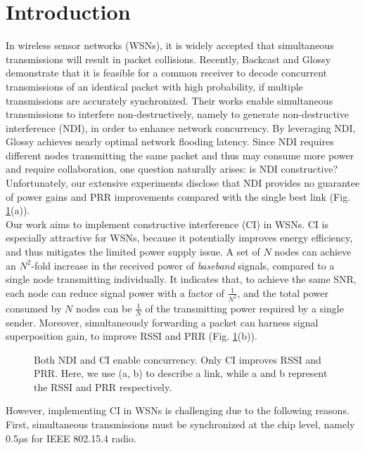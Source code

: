 \documentclass[conference]{IEEEtran}
\begin{document}
\section{Introduction}
In wireless sensor networks (WSNs), it is widely accepted that simultaneous transmissions will result in packet collisions.
Recently, Backcast\cite{DuttaSensys10Backcast} and Glossy\cite{ferrari11Glossy} demonstrate that it is feasible for a common receiver to decode concurrent transmissions of an identical packet with high probability, if multiple transmissions are accurately synchronized.
Their works enable simultaneous transmissions to interfere non-destructively, namely to generate non-destructive interference (NDI), in order to enhance network concurrency.
By leveraging NDI, Glossy achieves nearly optimal network flooding latency.
Since NDI requires different nodes transmitting the same packet and thus may consume more power and require collaboration, one question naturally arises: is NDI constructive? Unfortunately, our extensive experiments disclose that NDI provides no guarantee of power gains and PRR improvements compared with the single best link (Fig. \ref{Fig_NDIandCI}(a)).\\
\indent  Our work aims to implement constructive interference (CI) in WSNs.
CI is especially attractive for WSNs, because it potentially improves energy efficiency, and thus mitigates the limited power supply issue.
A set of $N$ nodes can achieve an $N^2$-fold increase in the received power of \emph{baseband} signals, compared to a single node transmitting individually.
It indicates that, to achieve the same SNR, each node can reduce signal power with a factor of $\frac{1}{N^2}$, and the total power consumed by $N$ nodes can be $\frac{1}{N}$ of the transmitting power required by a single sender.
Moreover, simultaneously forwarding a packet can harness signal superposition gain, to improve RSSI and PRR (Fig. \ref{Fig_NDIandCI}(b)).\\
\begin{figure}
\centering
\caption{Both NDI and CI enable concurrency. Only CI improves RSSI and PRR. Here, we use (a, b) to describe a link, while a and b represent the RSSI and PRR respectively.}
{\label{Fig_NDIandCI}}
\end{figure}
\indent However, implementing CI in WSNs is challenging due to the following reasons. First, simultaneous transmissions must be synchronized at the chip level, namely 0.5$\mu$s for IEEE 802.15.4 radio.
\end{document}
